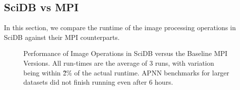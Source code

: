 \documentclass[tog]{acmsiggraph}
\begin{document}
\subsection{SciDB vs MPI}\label{sec:clusterexp}
In this section, we compare the runtime of the image processing operations in
SciDB against their MPI counterparts.

\begin{figure}[htp] \centering
{}
\hspace{1 em}
\hspace{1 em}
	\caption{Performance of Image Operations in SciDB versus the Baseline MPI
Versions. All run-times are the average of 3 runs, with variation being within
\~2\% of the actual runtime. APNN benchmarks for larger datasets did not finish
running even after 6 hours.}
	\label{fig:mpi_result}
\end{figure}
\end{document}
